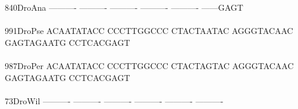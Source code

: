 \documentclass[11pt,twoside,reqno,a4paper]{article}
\begin{document}
{840\hspace*{2\charwidth}DroAna	----------	----------	----------	----------	----------	------GAGT	\\
\hspace*{5\charwidth}\hspace*{7\charwidth}\hspace*{1\charwidth}\hspace*{1\charwidth}\hspace*{1\charwidth}\hspace*{1\charwidth}\hspace*{1\charwidth}\hspace*{1\charwidth}\\
991\hspace*{2\charwidth}DroPse	ACAATATACC	CCCTTGGCCC	CTACTAATAC	AGGGTACAAC	GAGTAGAATG	CCTCACGAGT	\\
\hspace*{5\charwidth}\hspace*{7\charwidth}\hspace*{1\charwidth}\hspace*{1\charwidth}\hspace*{1\charwidth}\hspace*{1\charwidth}\hspace*{1\charwidth}\hspace*{1\charwidth}\\
987\hspace*{2\charwidth}DroPer	ACAATATACC	CCCTTGGCCC	CTACTAGTAC	AGGGTACAAC	GAGTAGAATG	CCTCACGAGT	\\
\hspace*{5\charwidth}\hspace*{7\charwidth}\hspace*{1\charwidth}\hspace*{1\charwidth}\hspace*{1\charwidth}\hspace*{1\charwidth}\hspace*{1\charwidth}\hspace*{1\charwidth}\\
73\hspace*{3\charwidth}DroWil	----------	----------	----------	----------	----------	----------	\\
\hspace*{5\charwidth}\hspace*{7\charwidth}\hspace*{1\charwidth}\hspace*{1\charwidth}\hspace*{1\charwidth}\hspace*{1\charwidth}\hspace*{1\charwidth}\hspace*{1\charwidth}\\
}
\end{document}
